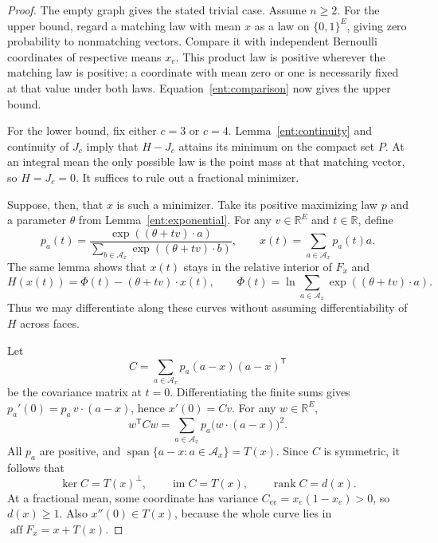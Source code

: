 \begin{proof}
The empty graph gives the stated trivial case. Assume \(n\ge2\).
For the upper bound, regard a matching law with mean \(x\) as a law
on \(\{0,1\}^E\), giving zero probability to nonmatching vectors.
Compare it with independent Bernoulli coordinates of respective
means \(x_e\).  This product law is positive wherever the matching
law is positive: a coordinate with mean zero or one is necessarily
fixed at that value under both laws.
Equation~\eqref{ent:comparison} now gives the upper bound.

For the lower bound, fix either \(c=3\) or \(c=4\).
Lemma~\ref{ent:continuity} and
continuity of \(J_c\) imply that \( H-J_c\) attains its minimum
on the compact set \(P\).
At an integral mean the only possible law is the point mass at that
matching vector, so \( H=J_c=0\).
It suffices to rule out a fractional minimizer.

Suppose, then, that \(x\) is such a minimizer.
Take its positive maximizing law \(p\) and a parameter \(\theta\)
from Lemma~\ref{ent:exponential}.
For any \(v\in\mathbb R^E\) and \(t\in\mathbb R\), define
\[
  p_a(t)=
  \frac{\exp((\theta+tv)\cdot a)}
       {\sum_{b\in\mathcal A_x}\exp((\theta+tv)\cdot b)},
  \qquad
  x(t)=\sum_{a\in\mathcal A_x}p_a(t)a.
\]
The same lemma shows that \(x(t)\) stays in the relative interior
of \(F_x\) and
\begin{equation}
   H(x(t))
  =\Phi(t)-(\theta+tv)\cdot x(t),
  \qquad
  \Phi(t)=\ln\sum_{a\in\mathcal A_x}
                       \exp((\theta+tv)\cdot a).
  \label{a:eq-tilted-entropy}
\end{equation}
Thus we may differentiate along these curves without assuming
differentiability of \( H\) across faces.

Let
\[
  C=\sum_{a\in\mathcal A_x}p_a(a-x)(a-x)^{\mathsf T}
\]
be the covariance matrix at \(t=0\).
Differentiating the finite sums gives
\(p_a'(0)=p_a\,v\cdot(a-x)\), hence \(x'(0)=Cv\).
For any \(w\in\mathbb R^E\),
\[
  w^{\mathsf T}Cw
  =\sum_{a\in\mathcal A_x}p_a\bigl(w\cdot(a-x)\bigr)^2.
\]
All \(p_a\) are positive, and
\(\operatorname{span}\{a-x:a\in\mathcal A_x\}=T(x)\).
Since \(C\) is symmetric, it follows that
\begin{equation}
  \ker C=T(x)^\perp,\qquad
  \operatorname{im}C=T(x),\qquad
  \operatorname{rank}C=d(x).
  \label{a:eq-covariance-face-space}
\end{equation}
At a fractional mean, some coordinate has variance
\(C_{ee}=x_e(1-x_e)>0\), so \(d(x)\ge1\).
Also \(x''(0)\in T(x)\), because the whole curve lies in
\(\operatorname{aff}F_x=x+T(x)\).


\end{proof}
